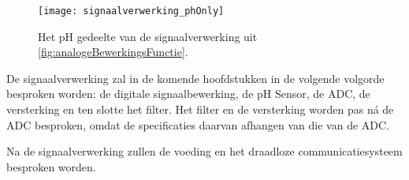 \begin{figure}[!htbp]
    \centering
    \texttt{[image: signaalverwerking\_phOnly]}
    \caption{Het pH gedeelte van de signaalverwerking uit \cref{fig:analogeBewerkingsFunctie}.}
    \label{fig:signaalverwerking_phOnly}
\end{figure}

De signaalverwerking zal in de komende hoofdstukken in de volgende volgorde besproken worden: de digitale signaalbewerking, de pH Sensor, de ADC, de versterking en ten slotte het filter. Het filter en de versterking worden pas n\'a %
de ADC besproken, omdat de specificaties daarvan afhangen van die van de ADC.

Na de signaalverwerking zullen de voeding en het draadloze communicatiesysteem besproken worden.
%






% 







%
